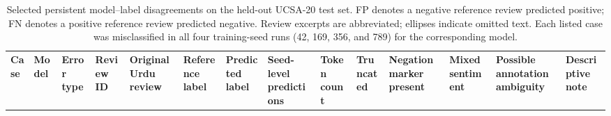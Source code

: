\documentclass[12pt,a4paper]{article}
\begin{document}

%
%
%

\begingroup

\renewcommand{\thetable}{S5}

\begin{landscape}

\begin{table}[p]
\centering

\caption{Selected persistent model--label disagreements on the held-out UCSA-20 test set. FP denotes a negative reference review predicted positive; FN denotes a positive reference review predicted negative. Review excerpts are abbreviated; ellipses indicate omitted text. Each listed case was misclassified in all four training-seed runs (42, 169, 356, and 789) for the corresponding model.}

\label{tab:supp_error_cases}

\setlength{\tabcolsep}{1.15pt}
\renewcommand{\arraystretch}{1.30}

\scriptsize

\begin{tabularx}{\linewidth}{@{}
>{\raggedright\arraybackslash}p{7mm}
>{\raggedright\arraybackslash}p{20mm}
>{\raggedright\arraybackslash}p{9mm}
>{\raggedright\arraybackslash}p{14mm}
>{\raggedright\arraybackslash}X
>{\centering\arraybackslash}p{17mm}
>{\centering\arraybackslash}p{17mm}
>{\raggedright\arraybackslash}p{26mm}
>{\centering\arraybackslash}p{10mm}
>{\centering\arraybackslash}p{17mm}
>{\centering\arraybackslash}p{15mm}
>{\centering\arraybackslash}p{15mm}
>{\centering\arraybackslash}p{18mm}
>{\raggedright\arraybackslash}X
@{}}

\toprule

\textbf{Case} &
\textbf{Model} &
\textbf{Error type} &
\textbf{Review ID} &
\textbf{Original Urdu review} &
\textbf{Reference label} &
\textbf{Predicted label} &
\textbf{Seed-level predictions} &
\textbf{Token count} &
\textbf{Truncated} &
\textbf{Negation marker present} &
\textbf{Mixed sentiment} &
\textbf{Possible annotation ambiguity} &
\textbf{Descriptive note} \\


\end{tabularx}
\end{table}
\end{landscape}
\end{document}
